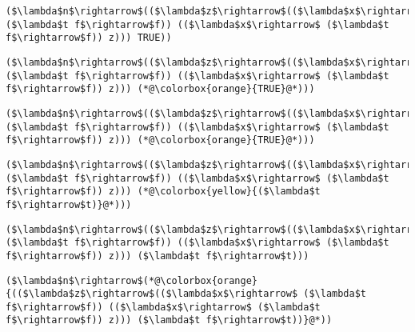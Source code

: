 \documentclass{beamer}
\begin{document}
\begin{frame}[fragile]{\CurrentSection}
\lstset{basicstyle=\ttfamily\small}\lstset{numbers=none}\lstset{language=ML}\begin{lstlisting}
($\lambda$n$\rightarrow$(($\lambda$z$\rightarrow$(($\lambda$x$\rightarrow$ ($\lambda$t f$\rightarrow$f)) (($\lambda$x$\rightarrow$ ($\lambda$t f$\rightarrow$f)) z))) TRUE))
\end{lstlisting}
\pause\lstset{language=ML}\begin{lstlisting}
($\lambda$n$\rightarrow$(($\lambda$z$\rightarrow$(($\lambda$x$\rightarrow$ ($\lambda$t f$\rightarrow$f)) (($\lambda$x$\rightarrow$ ($\lambda$t f$\rightarrow$f)) z))) (*@\colorbox{orange}{TRUE}@*)))
\end{lstlisting}

\end{frame}

\begin{frame}[fragile]{\CurrentSection}
\lstset{basicstyle=\ttfamily\small}\lstset{numbers=none}\lstset{language=ML}\begin{lstlisting}
($\lambda$n$\rightarrow$(($\lambda$z$\rightarrow$(($\lambda$x$\rightarrow$ ($\lambda$t f$\rightarrow$f)) (($\lambda$x$\rightarrow$ ($\lambda$t f$\rightarrow$f)) z))) (*@\colorbox{orange}{TRUE}@*)))
\end{lstlisting}
\pause\lstset{language=ML}\begin{lstlisting}
($\lambda$n$\rightarrow$(($\lambda$z$\rightarrow$(($\lambda$x$\rightarrow$ ($\lambda$t f$\rightarrow$f)) (($\lambda$x$\rightarrow$ ($\lambda$t f$\rightarrow$f)) z))) (*@\colorbox{yellow}{($\lambda$t f$\rightarrow$t)}@*)))
\end{lstlisting}

\end{frame}

\begin{frame}[fragile]{\CurrentSection}
\lstset{basicstyle=\ttfamily\small}\lstset{numbers=none}\lstset{language=ML}\begin{lstlisting}
($\lambda$n$\rightarrow$(($\lambda$z$\rightarrow$(($\lambda$x$\rightarrow$ ($\lambda$t f$\rightarrow$f)) (($\lambda$x$\rightarrow$ ($\lambda$t f$\rightarrow$f)) z))) ($\lambda$t f$\rightarrow$t)))
\end{lstlisting}
\pause\lstset{language=ML}\begin{lstlisting}
($\lambda$n$\rightarrow$(*@\colorbox{orange}{(($\lambda$z$\rightarrow$(($\lambda$x$\rightarrow$ ($\lambda$t f$\rightarrow$f)) (($\lambda$x$\rightarrow$ ($\lambda$t f$\rightarrow$f)) z))) ($\lambda$t f$\rightarrow$t))}@*))
\end{lstlisting}

\end{frame}
\end{document}
